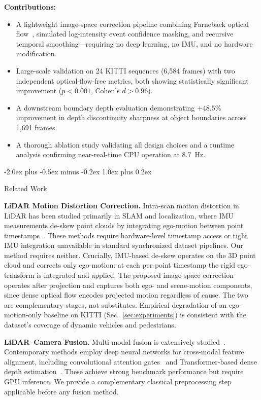 \documentclass[conference]{IEEEtran}
\makeatletter
\def\section{\@startsection{section}{1}{\z@}
  {-2.0ex plus -0.5ex minus -0.2ex}
  {1.0ex plus 0.2ex}
  {\normalfont\large\bfseries\raggedright}}
\makeatother
\begin{document}
\textbf{Contributions:}
\begin{itemize}
  \item A lightweight image-space correction pipeline combining
    Farneback optical flow~\cite{farneback}, simulated
    log-intensity event confidence masking, and recursive temporal
    smoothing---requiring no deep learning, no IMU, and no
    hardware modification.
  \item Large-scale validation on 24 KITTI sequences (6{,}584
    frames) with two independent optical-flow-free metrics, both
    showing statistically significant improvement ($p{<}0.001$,
    Cohen's $d{>}0.96$).
  \item A downstream boundary depth evaluation demonstrating
    $+48.5\%$ improvement in depth discontinuity sharpness at
    object boundaries across 1{,}691 frames.
  \item A thorough ablation study validating all design choices
    and a runtime analysis confirming near-real-time CPU
    operation at 8.7~Hz.
\end{itemize}

\section{Related Work}

\textbf{LiDAR Motion Distortion Correction.}
Intra-scan motion distortion in LiDAR has been studied primarily
in SLAM and localization, where IMU measurements de-skew point
clouds by integrating ego-motion between point
timestamps~\cite{kitti,zhang2014loam}. These methods require
hardware-level timestamp access or tight IMU integration
unavailable in standard synchronized dataset pipelines. Our
method requires neither.
Crucially, IMU-based de-skew operates on the 3D point cloud and
corrects only ego-motion: at each per-point timestamp the rigid
ego-transform is integrated and applied. The proposed image-space
correction operates after projection and captures both ego- and
scene-motion components, since dense optical flow encodes
projected motion regardless of cause. The two are complementary
stages, not substitutes. Empirical degradation of an
ego-motion-only baseline on KITTI (Sec.~\ref{sec:experiments})
is consistent with the dataset's coverage of dynamic vehicles
and pedestrians.

\textbf{LiDAR--Camera Fusion.}
Multi-modal fusion is extensively studied~\cite{huang2021,delta2025}.
Contemporary methods employ deep neural networks for cross-modal
feature alignment, including convolutional attention
gates~\cite{huang2021} and Transformer-based dense depth
estimation~\cite{delta2025}. These achieve strong benchmark
performance but require GPU inference. We provide a complementary
classical preprocessing step applicable before any fusion method.
\end{document}
